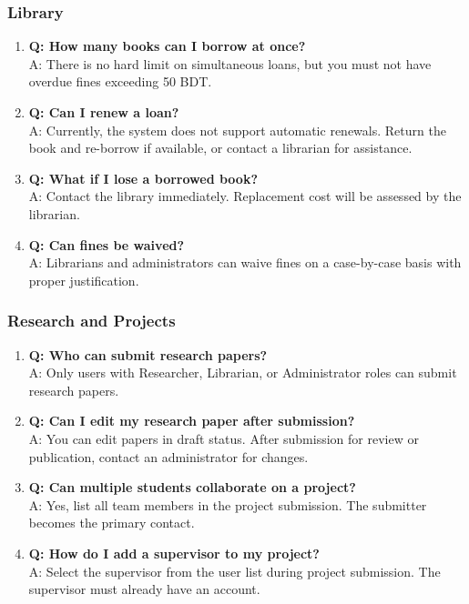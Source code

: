 \documentclass[12pt,a4paper]{article}
\begin{document}
\subsubsection{Library}
\begin{enumerate}[leftmargin=*]
    \item \textbf{Q: How many books can I borrow at once?}\\
    A: There is no hard limit on simultaneous loans, but you must not have overdue fines exceeding 50 BDT.
    
    \item \textbf{Q: Can I renew a loan?}\\
    A: Currently, the system does not support automatic renewals. Return the book and re-borrow if available, or contact a librarian for assistance.
    
    \item \textbf{Q: What if I lose a borrowed book?}\\
    A: Contact the library immediately. Replacement cost will be assessed by the librarian.
    
    \item \textbf{Q: Can fines be waived?}\\
    A: Librarians and administrators can waive fines on a case-by-case basis with proper justification.
\end{enumerate}

\subsubsection{Research and Projects}
\begin{enumerate}[leftmargin=*]
    \item \textbf{Q: Who can submit research papers?}\\
    A: Only users with Researcher, Librarian, or Administrator roles can submit research papers.
    
    \item \textbf{Q: Can I edit my research paper after submission?}\\
    A: You can edit papers in draft status. After submission for review or publication, contact an administrator for changes.
    
    \item \textbf{Q: Can multiple students collaborate on a project?}\\
    A: Yes, list all team members in the project submission. The submitter becomes the primary contact.
    
    \item \textbf{Q: How do I add a supervisor to my project?}\\
    A: Select the supervisor from the user list during project submission. The supervisor must already have an account.
\end{enumerate}
\end{document}
